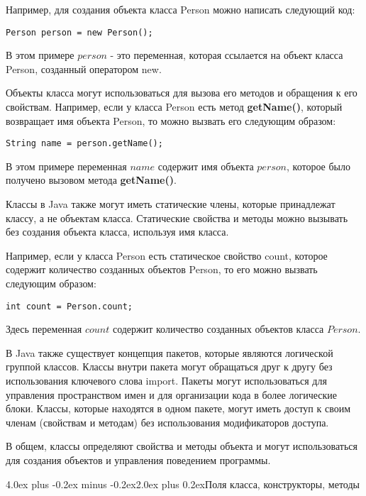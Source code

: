 \documentclass[12pt, a4paper]{book}%
\makeatletter
\renewcommand{\section}{\@startsection{section}{1}{1pt}%
{4.0ex plus -0.2ex minus -0.2ex}{2.0ex plus 0.2ex}{\centering\bf}}%
\makeatother
\begin{document}
{\newpage
Например, для создания объекта класса Person можно написать следующий код:

\begin{lstlisting}
Person person = new Person();
\end{lstlisting}

В этом примере $person$ - это переменная, которая ссылается на объект класса Person, созданный оператором new.

Объекты класса могут использоваться для вызова его методов и обращения к его свойствам. Например, если у класса Person есть метод {\bf getName()}, который возвращает имя объекта Person, то можно вызвать его следующим образом:

\begin{lstlisting}
String name = person.getName();
\end{lstlisting}

В этом примере переменная $name$ содержит имя объекта $person$, которое было получено вызовом метода {\bf getName()}.

Классы в Java также могут иметь статические члены, которые принадлежат классу, а не объектам класса. Статические свойства и методы можно вызывать без создания объекта класса, используя имя класса. 

Например, если у класса Person есть статическое свойство count, которое содержит количество созданных объектов Person, то его можно вызвать следующим образом:

\begin{lstlisting}
int count = Person.count;
\end{lstlisting}

Здесь переменная $count$ содержит количество созданных объектов класса $Person$.

В Java также существует концепция пакетов, которые являются логической группой классов. Классы внутри пакета могут обращаться друг к другу без использования ключевого слова import. Пакеты могут использоваться для управления пространством имен и для организации кода в более логические блоки. Классы, которые находятся в одном пакете, могут иметь доступ к своим членам (свойствам и методам) без использования модификаторов доступа.

В общем, классы определяют свойства и методы объекта и могут использоваться для создания объектов и управления поведением программы.

\section{Поля класса, конструкторы, методы}

}
\end{document}
